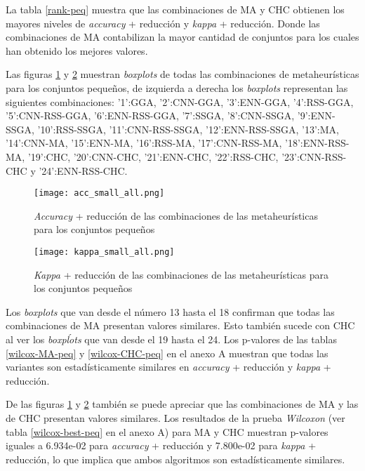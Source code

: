 La tabla \ref{rank-peq} muestra que las combinaciones de MA y CHC obtienen los mayores niveles de \emph{accuracy} + reducción y \emph{kappa} + reducción. Donde las combinaciones de MA contabilizan la mayor cantidad de conjuntos para los cuales han obtenido los mejores valores.

\newpage

Las figuras \ref{small-accu-all} y \ref{small-kap-all} muestran \emph{boxplots} de todas las combinaciones de metaheurísticas para los conjuntos pequeños, de izquierda a derecha los \emph{boxplots} representan las siguientes combinaciones: '1':GGA, '2':CNN-GGA, '3':ENN-GGA, '4':RSS-GGA, '5':CNN-RSS-GGA, '6':ENN-RSS-GGA, '7':SSGA, '8':CNN-SSGA, '9':ENN-SSGA, '10':RSS-SSGA, '11':CNN-RSS-SSGA, '12':ENN-RSS-SSGA, '13':MA, '14':CNN-MA, '15':ENN-MA, '16':RSS-MA, '17':CNN-RSS-MA, '18':ENN-RSS-MA, '19':CHC, '20':CNN-CHC, '21':ENN-CHC, '22':RSS-CHC, '23':CNN-RSS-CHC y '24':ENN-RSS-CHC.

\begin{figure}[h!]

	\centering
	\texttt{[image: acc\_small\_all.png]}

\caption{\emph{Accuracy} + reducción de las combinaciones de las metaheurísticas para los conjuntos pequeños}
\label{small-accu-all}
\end{figure}

\newpage

\begin{figure}[h!]

	\centering
	\texttt{[image: kappa\_small\_all.png]}

\caption{\emph{Kappa} + reducción de las combinaciones de las metaheurísticas para los conjuntos pequeños}
\label{small-kap-all}
\end{figure}

Los \emph{boxplots} que van desde el número 13 hasta el 18 confirman que todas las combinaciones de MA presentan valores similares. Esto también sucede con CHC al ver los \emph{boxpĺots} que van desde el 19 hasta el 24. Los p-valores de las tablas \ref{wilcox-MA-peq} y \ref{wilcox-CHC-peq} en el anexo A muestran que todas las variantes son estadísticamente similares en \emph{accuracy} + reducción y \emph{kappa} + reducción.

De las figuras \ref{small-accu-all} y \ref{small-kap-all} también se puede apreciar que las combinaciones de MA y las de CHC presentan valores similares. Los resultados de la prueba \emph{Wilcoxon} (ver tabla \ref{wilcox-best-peq} en el anexo A) para MA y CHC muestran p-valores iguales a 6.934e-02 para \emph{accuracy} + reducción y 7.800e-02 para \emph{kappa} + reducción, lo que implica que ambos algoritmos son estadísticamente similares.


